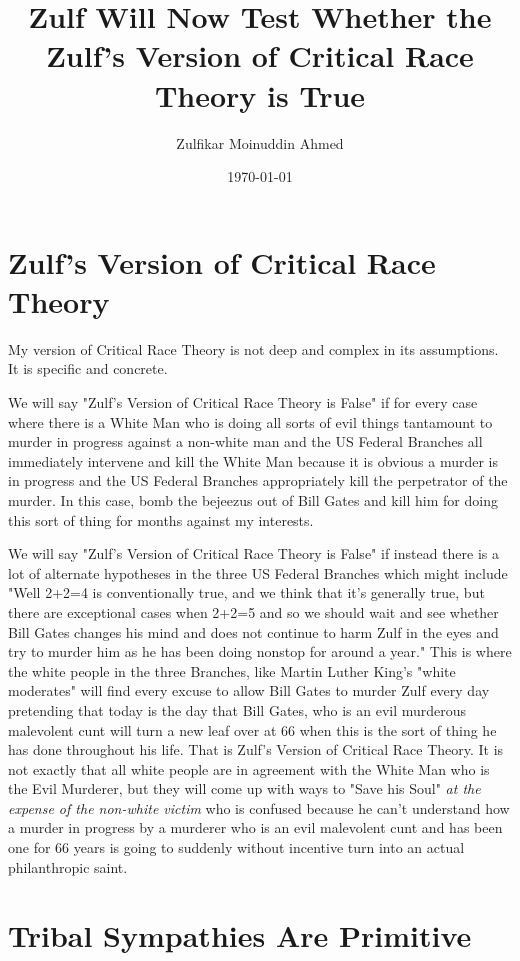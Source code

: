\documentclass{amsart}
\title{Zulf Will Now Test Whether the Zulf's Version of Critical Race Theory is True}
\author{Zulfikar Moinuddin Ahmed}
\date{\today}
\begin{document}
\maketitle

\section{Zulf's Version of Critical Race Theory}

My version of Critical Race Theory is not deep and complex in its assumptions.  It is specific and concrete.  

We will say "Zulf's Version of Critical Race Theory is False" if for every case where there is a White Man who is doing all sorts of evil things tantamount to murder in progress against a non-white man and the US Federal Branches all immediately intervene and kill the White Man because it is obvious a murder is in progress and the US Federal Branches appropriately kill the perpetrator of the murder.  In this case, bomb the bejeezus out of Bill Gates and kill him for doing this sort of thing for months against my interests.

We will say "Zulf's Version of Critical Race Theory is False" if instead there is a lot of alternate hypotheses in the three US Federal Branches which might include "Well 2+2=4 is conventionally true, and we think that it's generally true, but there are exceptional cases when 2+2=5 and so we should wait and see whether Bill Gates changes his mind and does not continue to harm Zulf in the eyes and try to murder him as he has been doing nonstop for around a year."  This is where the white people in the three Branches, like Martin Luther King's "white moderates" will find every excuse to allow Bill Gates to murder Zulf every day pretending that today is the day that Bill Gates, who is an evil murderous malevolent cunt will turn a new leaf over at 66 when this is the sort of thing he has done throughout his life.  That is Zulf's Version of Critical Race Theory.  It is not exactly that all white people are in agreement with the White Man who is the Evil Murderer, but they will come up with ways to "Save his Soul" {\em at the expense of the non-white victim} who is confused because he can't understand how a murder in progress by a murderer who is an evil malevolent cunt and has been one for 66 years is going to suddenly without incentive turn into an actual philanthropic saint.

\section{Tribal Sympathies Are Primitive}
\end{document}
